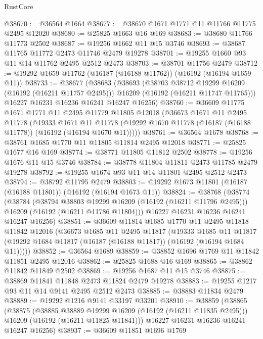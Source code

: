 \begin{lexlean}{RustCore}
\begin{coremodule}
@38670 := @36564 @1664
@38677 := @38670 @1671 @1771 @11 @11766 @11775 @2495 @12020
@38680 := @25825 @1663 @16 @169
@38683 := @38680 @11766 @11773 @2502
@38687 := @19256 @1662 @11 @15 @3746
@38693 := @38687 @11765 @11772 @2473 @11746 @2479 @19278
@38701 := @19255 @1660 @93 @11 @14 @11762 @2495 @2512 @2473
@38703 := @38701 @11756 @2479
@38712 := @19292 @1659 @11762 (@16187 (@16188 @11762)) (@16192 (@16194 @1659 @11))
@38733 := @38677
    (@38683
      (@38693
        (@38703 @38712 @19299 @16209 (@16192 (@16211 @11757 @2495)))
        @16209
        (@16192 (@16211 @11747 @11765)))
      @16227
      @16231
      @16236
      @16241
      @16247
      @16256)
@38760 := @36609
    @11775
    @1671
    @1771
    @11
    @2495
    @11779
    @11805
    @12018
    (@36673
      @1671
      @11
      @2495
      @11778
      (@19333
        @1671
        @11
        @11778
        (@19292 @1670 @11778 (@16187 (@16188 @11778)) (@16192 (@16194 @1670 @11)))))
@38761 := @36564 @1678
@38768 := @38761 @1685 @1770 @11 @11805 @11814 @2495 @12018
@38771 := @25825 @1677 @16 @169
@38774 := @38771 @11805 @11812 @2502
@38778 := @19256 @1676 @11 @15 @3746
@38784 := @38778 @11804 @11811 @2473 @11785 @2479 @19278
@38792 := @19255 @1674 @93 @11 @14 @11801 @2495 @2512 @2473
@38794 := @38792 @11795 @2479
@38803 := @19292 @1673 @11801 (@16187 (@16188 @11801)) (@16192 (@16194 @1673 @11))
@38824 := @38768
    (@38774
      (@38784
        (@38794 @38803 @19299 @16209 (@16192 (@16211 @11796 @2495)))
        @16209
        (@16192 (@16211 @11786 @11804)))
      @16227
      @16231
      @16236
      @16241
      @16247
      @16256)
@38851 := @36609
    @11814
    @1685
    @1770
    @11
    @2495
    @11818
    @11842
    @12016
    (@36673
      @1685
      @11
      @2495
      @11817
      (@19333
        @1685
        @11
        @11817
        (@19292 @1684 @11817 (@16187 (@16188 @11817)) (@16192 (@16194 @1684 @11)))))
@38852 := @36564 @1689
@38859 := @38852 @1696 @1769 @11 @11842 @11851 @2495 @12016
@38862 := @25825 @1688 @16 @169
@38865 := @38862 @11842 @11849 @2502
@38869 := @19256 @1687 @11 @15 @3746
@38875 := @38869 @11841 @11848 @2473 @11824 @2479 @19278
@38883 := @19255 @1217 @93 @11 @14 @9141 @2495 @2512 @2473
@38885 := @38883 @11834 @2479
@38889 := @19292 @1216 @9141 @33197 @33201
@38910 := @38859
    (@38865
      (@38875
        (@38885 @38889 @19299 @16209 (@16192 (@16211 @11835 @2495)))
        @16209
        (@16192 (@16211 @11825 @11841)))
      @16227
      @16231
      @16236
      @16241
      @16247
      @16256)
@38937 := @36609
    @11851
    @1696
    @1769

\end{coremodule}
\end{lexlean}
